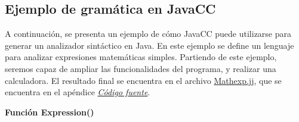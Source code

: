 




\subsection{Ejemplo de gramática en JavaCC}
\noindent A continuación, se presenta un ejemplo de cómo JavaCC puede utilizarse para generar un analizador sintáctico en Java. En este ejemplo se define un lenguaje para analizar expresiones matemáticas simples. Partiendo de este ejemplo, seremos capaz de ampliar las funcionalidades del programa, y realizar una calculadora. El resultado final se encuentra en el archivo \hyperref[sec:mathexp]{Mathexp.jj}, que se encuentra en el apéndice \hyperref[sec:codigofuente]{\textit{Código fuente}}.

\phantom{text}

\noindent \textbf{Función Expression()}

\phantom{text}

\lstset{inputencoding=utf8/latin1}


